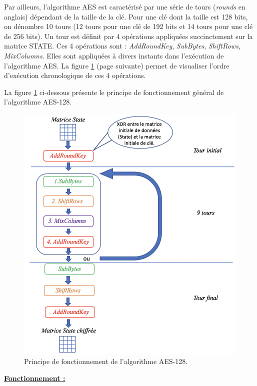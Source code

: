 \documentclass[10pt, oneside, a4paper]{article}
\begin{document}
Par ailleurs, l'algorithme AES est caractérisé par une série de tours (\textit{rounds} en anglais) dépendant de la taille de la clé. Pour une clé dont la taille est 128 bits, on dénombre 10 tours (12 tours pour une clé de 192 bits et 14 tours pour une clé de 256 bits). Un tour est définit par 4 opérations appliquées succinctement sur la matrice STATE. Ces 4 opérations sont : \textit{AddRoundKey}, \textit{SubBytes}, \textit{ShiftRows}, \textit{MixColumns}. Elles sont appliquées à divers instants dans l'exécution de l'algorithme AES. La figure \ref{fig:AES} (page suivante) permet de visualiser l'ordre d'exécution chronologique de ces 4 opérations. 

\newpage

La figure \ref{fig:AES} ci-dessous présente le principe de fonctionnement général de l'algorithme AES-128.
\begin{figure}[htbp]
    \centering
    \includegraphics[scale=0.75]{image/AES}
    \caption{Principe de fonctionnement de l'algorithme AES-128.} 
    \label{fig:AES}
\end{figure}



\underline{\textbf{Fonctionnement :}} 
\end{document}
